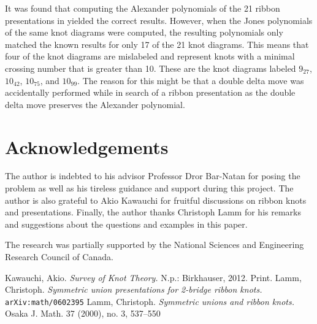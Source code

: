 \documentclass{ws-jktr}
\begin{document}
It was found that computing the Alexander polynomials of the 21 ribbon
presentations in \cite{knots} yielded the correct results.
However, when the Jones polynomials of the same knot diagrams were computed,
the resulting polynomials only matched the known results for only 17 of the 21
knot diagrams.
This means that four of the knot diagrams are mislabeled and represent knots
with a minimal crossing number that is greater than 10.
These are the knot diagrams labeled $9_{27}$, $10_{42}$, $10_{75}$, and
$10_{99}$.
The reason for this might be that a double delta move was accidentally performed
while in search of a ribbon presentation as the double delta move preserves the
Alexander polynomial.

\section*{Acknowledgements}

The author is indebted to his advisor Professor Dror Bar-Natan for posing the problem as well as his tireless guidance and support during this project.
The author is also grateful to Akio Kawauchi for fruitful discussions on ribbon
knots and presentations.
Finally, the author thanks Christoph Lamm for his remarks and suggestions about
the questions and examples in this paper.

The research was partially supported by the National Sciences and Engineering
Research Council of Canada.

\begin{thebibliography}{0}
Kawauchi, Akio.
\textit{Survey of Knot Theory.}
N.p.: Birkhauser, 2012. Print.
Lamm, Christoph.
\textit{Symmetric union presentations for 2-bridge ribbon knots.}\\
\texttt{arXiv:math/0602395}
Lamm, Christoph.
\textit{Symmetric unions and ribbon knots.}
Osaka J. Math. 37 (2000), no. 3, 537--550\vfill
\end{thebibliography}
\end{document}

